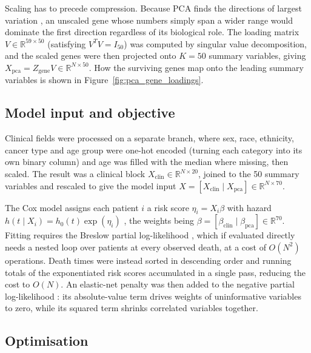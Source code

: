 \documentclass[10pt,a4paper]{article}
\begin{document}
Scaling has to precede compression. Because PCA finds the directions of largest
variation \citep{hotelling1933analysis, jolliffe2016principal}, an unscaled gene
whose numbers simply span a wider range would dominate the first direction
regardless of its biological role. The loading matrix
$V \in \mathbb{R}^{59 \times 50}$ (satisfying $V^{T} V = I_{50}$) was computed by
singular value decomposition, and the scaled genes were then projected onto
$K = 50$ summary variables, giving
$X_{\text{pca}} = Z_{\text{gene}} V \in \mathbb{R}^{N \times 50}$. How the surviving
genes map onto the leading summary variables is shown in
Figure~\ref{fig:pca_gene_loadings}.

\subsection{Model input and objective}

Clinical fields were processed on a separate branch, where sex, race, ethnicity,
cancer type and age group were one-hot encoded (turning each category into its own
binary column) and age was filled with the median where missing, then scaled. The
result was a clinical block $X_{\text{clin}} \in \mathbb{R}^{N \times 20}$, joined
to the 50 summary variables and rescaled to give the model input
$X = [X_{\text{clin}} \mid X_{\text{pca}}] \in \mathbb{R}^{N \times 70}$.

The Cox model assigns each patient $i$ a risk score $\eta_i = X_i \beta$ with
hazard $h(t \mid X_i) = h_0(t) \exp(\eta_i)$ \citep{cox1972regression}, the weights
being $\beta = [\beta_{\text{clin}} \mid \beta_{\text{pca}}] \in \mathbb{R}^{70}$.
Fitting requires the Breslow partial log-likelihood
\citep{breslow1972discussion}, which if evaluated directly needs a nested loop over
patients at every observed death, at a cost of $O(N^2)$ operations. Death times
were instead sorted in descending order and running totals of the exponentiated
risk scores accumulated in a single pass, reducing the cost to $O(N)$. An
elastic-net penalty was then added to the negative partial log-likelihood
\citep{zou2005regularization, wu2012elastic}: its absolute-value term drives
weights of uninformative variables to zero, while its squared term shrinks
correlated variables together.

\subsection{Optimisation}
\end{document}
